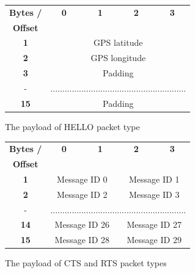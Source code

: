 \documentclass[12pt,a4paper]{report}
\begin{document}
\begin{figure}[h]
\begin{center}
\begin{tabular}{ |c|c|c|c|c| }
\hline
\textbf{Bytes /} & \textbf{0} & \textbf{1} & \textbf{2} & \textbf{3} \\ 
\textbf{Offset} &  &  &  &  \\ 
\hline
\textbf{1} &     \multicolumn{4}{c|}{GPS latitude}  \\ 
\hline
\textbf{2} &     \multicolumn{4}{c|}{GPS longitude}  \\
\hline
\textbf{3} &     \multicolumn{4}{c|}{Padding}  \\
\hline
 - & \multicolumn{4}{c|}{.........................................................}  \\
 \hline
\textbf{15} &     \multicolumn{4}{c|}{Padding}  \\
\hline
\end{tabular}
\end{center}
\caption{The payload of HELLO packet type}
\end{figure}

\begin{figure}[h]
\begin{center}\begin{tabular}{ |c|c|c|c|c| }
\hline
\textbf{Bytes /} & \textbf{0} & \textbf{1} & \textbf{2} & \textbf{3} \\ 
\textbf{Offset} &  &  &  &  \\ 
\hline
\textbf{1} &     \multicolumn{2}{c|}{Message ID 0}  & \multicolumn{2}{c|}{Message ID 1}  \\ 
\hline
\textbf{2} &  \multicolumn{2}{c|}{Message ID 2}  & \multicolumn{2}{c|}{Message ID 3}   \\
\hline
 - & \multicolumn{4}{c|}{.........................................................}  \\
 \hline
 \textbf{14} &  \multicolumn{2}{c|}{Message ID 26}  & \multicolumn{2}{c|}{Message ID 27}   \\
\hline
\textbf{15} &   \multicolumn{2}{c|}{Message ID 28}  & \multicolumn{2}{c|}{Message ID 29}   \\
\hline
\end{tabular}
\end{center}
\caption{The payload of CTS and RTS packet types}
\end{figure}
\end{document}

